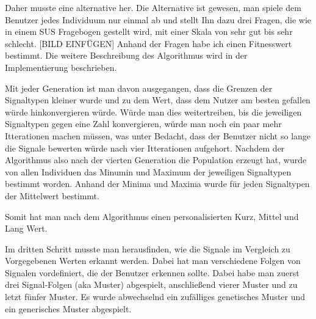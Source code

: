 Daher musste eine alternative her. Die Alternative ist gewesen, man spiele dem Benutzer jedes Individuum nur einmal ab und stellt Ihn dazu drei Fragen, die wie in einem SUS Fragebogen gestellt wird, mit einer Skala von sehr gut bis sehr schlecht. [BILD EINFÜGEN]
Anhand der Fragen habe ich einen Fitnesswert bestimmt. Die weitere Beschreibung des Algorithmus wird in der Implementierung beschrieben.

Mit jeder Generation ist man davon ausgegangen, dass die Grenzen der Signaltypen kleiner wurde und zu dem Wert, dass dem Nutzer am besten gefallen würde hinkonvergieren würde.
 Würde man dies weitertreiben, bis die jeweiligen Signaltypen gegen eine Zahl konvergieren, würde man noch ein paar mehr Itterationen machen müssen, was unter Bedacht, dass der Benutzer nicht so lange die Signale bewerten würde nach vier Itterationen aufgehort. Nachdem der Algorithmus also nach der vierten Generation die Population erzeugt hat, wurde von allen Individuen das Minumin und Maximum der jeweiligen Signaltypen bestimmt worden. Anhand der Minima und Maxima wurde für jeden Signaltypen der Mittelwert bestimmt.

Somit hat man nach dem Algorithmus einen personalisierten Kurz, Mittel und Lang Wert.

Im dritten Schritt musste man herausfinden, wie die Signale im Vergleich zu Vorgegebenen Werten erkannt werden.
Dabei hat man verschiedene Folgen von Signalen vordefiniert, die der Benutzer erkennen sollte. Dabei habe man zuerst drei Signal-Folgen (aka Muster) abgespielt, anschließend vierer Muster und zu letzt fünfer Muster. Es wurde abwechselnd ein zufälliges genetisches Muster und ein generisches Muster abgespielt. 